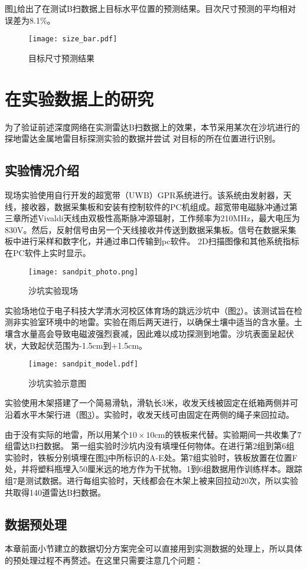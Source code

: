 图\ref{size_bar}给出了在测试B扫数据上目标水平位置的预测结果。目次尺寸预测的平均相对误差为8.1\%。
\begin{figure}[htbp]
	\texttt{[image: size\_bar.pdf]}
	\caption[]{目标尺寸预测结果}
	\label{size_bar}
\end{figure}
\section{在实验数据上的研究}
为了验证前述深度网络在实测雷达B扫数据上的效果，本节采用某次在沙坑进行的探地雷达金属地雷目标探测实验的数据并尝试
对目标的所在位置进行识别。
\subsection{实验情况介绍}
现场实验使用自行开发的超宽带（UWB）GPR系统进行。该系统由发射器，天线，接收器，数据采集板和安装有控制软件的PC机组成。超宽带电磁脉冲通过第三章所述Vivaldi天线由双极性高斯脉冲源辐射，工作频率为210MHz，最大电压为830V。然后，反射信号由另一个天线接收并传送到数据采集板。信号在数据采集板中进行采样和数字化，并通过串口传输到pc软件。 2D扫描图像和其他系统指标在PC软件上实时显示。
\begin{figure}[htbp]
	\texttt{[image: sandpit\_photo.png]}
	\caption[]{沙坑实验现场}
	\label{sandpit_photo}
\end{figure}

实验场地位于电子科技大学清水河校区体育场的跳远沙坑中（图\ref{sandpit_photo}）。该测试旨在检测非实验室环境中的地雷。实验在雨后两天进行，以确保土壤中适当的含水量。土壤含水量高会导致电磁波强烈衰减，因此难以成功探测到地雷。沙坑表面呈起伏状，大致起伏范围为-1.5cm到+1.5cm。
\begin{figure}[htbp]
	\texttt{[image: sandpit\_model.pdf]}
	\caption[]{沙坑实验示意图}
	\label{sandpit_model}
\end{figure}

实验使用木架搭建了一个简易滑轨，滑轨长3米，收发天线被固定在纸箱两侧并可沿着水平木架行进（图\ref{sandpit_model}）。实验时，收发天线可由固定在两侧的绳子来回拉动。

由于没有实际的地雷，所以用某个$10\times 10$cm的铁板来代替。实验期间一共收集了7组雷达B扫数据。
第一组实验时沙坑内没有填埋任何物体。在进行第2组到第6组实验时，铁板分别填埋在图\ref{sandpit_model}中所标识的A-E处。第7组实验时，铁板放置在位置F处，并将塑料瓶埋入50厘米远的地方作为干扰物。1到6组数据用作训练样本。跟踪组7是测试数据。进行每组实验时，天线都会在木架上被来回拉动20次，所以实验共取得140道雷达B扫数据。
\subsection{数据预处理}
本章前面小节建立的数据切分方案完全可以直接用到实测数据的处理上，所以具体的预处理过程不再赘述。在这里只需要注意几个问题：

